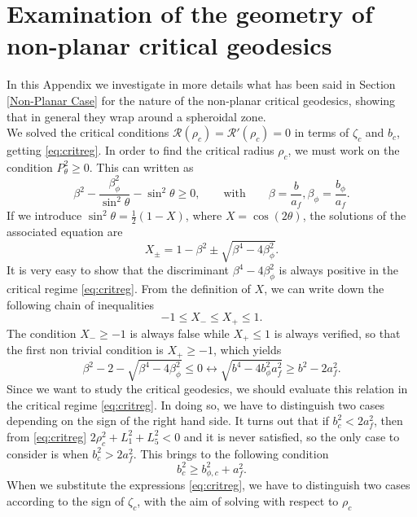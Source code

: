 \documentclass[prd,aps,a4paper,eqsecnum,nofootinbib,floatfix,twocolumn,superscriptaddress]{revtex4-2}
\newcommand{\be}{\begin{equation}}
\newcommand{\ee}{\end{equation}}
\begin{document}
\section{\label{APP:nonplangeo} Examination of the geometry of non-planar critical geodesics}
In this Appendix we investigate in more details what has been said in Section \ref{Non-Planar Case} for the nature of the non-planar critical geodesics, showing that in general they wrap around a spheroidal zone.\\ 
We solved the critical conditions $\mathcal{R}(\rho_c) = \mathcal{R}'(\rho_c) = 0$ in terms of $\zeta_c$ and $b_c$, getting \eqref{eq:critreg}. In order to find the critical radius $\rho_c$, we must work on the condition $P_\theta^2\geq 0$. This can written as
\begin{equation} \label{pos Ptheta}
\beta^2-\frac{\beta_\phi^2}{\sin^2\theta}-\sin^2\theta\geq0 ,\qquad \text{with} \qquad \beta=\frac{b}{a_f},\beta_{\phi}=\frac{b_{\phi}}{a_f}.
\end{equation}
If we introduce $\sin^2\theta=\frac{1}{2}(1-X)$, where $X=\cos(2\theta)$, the solutions of the associated equation are
\begin{equation}
X_\pm=1-\beta^2\pm\sqrt{\beta^4-4\beta_\phi^2}.
\end{equation}
It is very easy to show that the discriminant $\beta^4-4\beta_\phi^2$ is always positive in the critical regime \eqref{eq:critreg}. From the definition of $X$, we can write down the following chain of inequalities
\be
-1\leq X_-\leq X_+\leq 1.
\ee
The condition $X_-\geq-1$ is always false while $X_+\leq 1$ is always verified, so that the first non trivial condition is $X_+\geq-1$, which yields
\begin{equation}
\beta^2-2-\sqrt{\beta^4-4\beta_\phi^2}\leq0 \leftrightarrow \sqrt{b^4-4 b^2_\phi a^2_f} \geq b^2-2 a_f^2.
\end{equation}
Since we want to study the critical geodesics, we should evaluate this relation in the critical regime \eqref{eq:critreg}. In doing so, we have to distinguish two cases depending on the sign of the right hand side. It turns out that if $b^2_c< 2 a_f^2$, then from \eqref{eq:critreg} $2 \rho_c^2 + L_1^2+L_5^2 < 0$ and it is never satisfied, so the only case to consider is when $b^2_c > 2 a_f^2$. This brings to the following condition
\begin{equation}
    b^2_c \geq b^2_{\phi,c}+a_f^2.
\end{equation}
When we substitute the expressions \eqref{eq:critreg}, we have to distinguish two cases according to the sign of $\zeta_c$, with the aim of solving with respect to $\rho_c$
\end{document}
